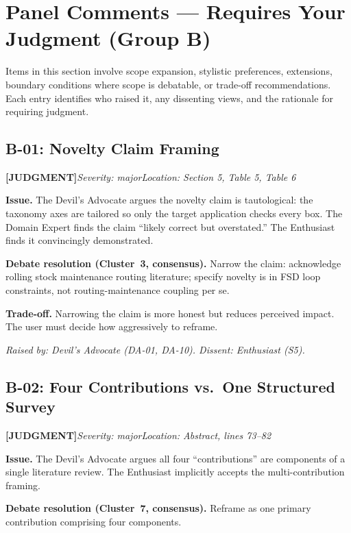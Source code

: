 \documentclass[11pt,a4paper]{article}
\newcommand{\judgmentlabel}{\textbf{\textcolor{judgmentorange}{[JUDGMENT]}}}
\begin{document}
\section{Panel Comments --- Requires Your Judgment (Group B)}

Items in this section involve scope expansion, stylistic preferences, extensions, boundary conditions where scope is debatable, or trade-off recommendations. Each entry identifies who raised it, any dissenting views, and the rationale for requiring judgment.

\subsection{B-01: Novelty Claim Framing}
\judgmentlabel\quad\textit{Severity: major}\quad\textit{Location: Section 5, Table 5, Table 6}

\textbf{Issue.} The Devil's Advocate argues the novelty claim is tautological: the taxonomy axes are tailored so only the target application checks every box. The Domain Expert finds the claim ``likely correct but overstated.'' The Enthusiast finds it convincingly demonstrated.

\textbf{Debate resolution (Cluster~3, consensus).} Narrow the claim: acknowledge rolling stock maintenance routing literature; specify novelty is in FSD loop constraints, not routing-maintenance coupling per se.

\textbf{Trade-off.} Narrowing the claim is more honest but reduces perceived impact. The user must decide how aggressively to reframe.

\textit{Raised by: Devil's Advocate (DA-01, DA-10). Dissent: Enthusiast (S5).}

\bigskip

\subsection{B-02: Four Contributions vs.\ One Structured Survey}
\judgmentlabel\quad\textit{Severity: major}\quad\textit{Location: Abstract, lines 73--82}

\textbf{Issue.} The Devil's Advocate argues all four ``contributions'' are components of a single literature review. The Enthusiast implicitly accepts the multi-contribution framing.

\textbf{Debate resolution (Cluster~7, consensus).} Reframe as one primary contribution comprising four components.
\end{document}
